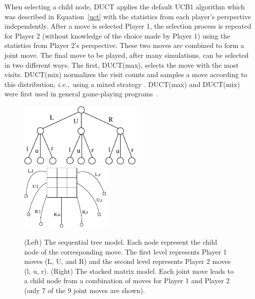 \documentclass{article}
\newcommand{\ie}{{\it i.e.,}~}
\begin{document}
When selecting a child node, DUCT applies the default UCB1 algorithm which was described in Equation~\ref{uct} with the statistics from each player's perspective independently. After a move is selected Player 1, the selection process is repeated for Player 2 (without knowledge of the choice made by Player 1) using the statistics from Player 2's perspective. These two moves are combined to form a joint move.
The final move to be played, after many simulations, can be selected in two different ways. The first, DUCT(max), selects the move with the most visits. 
DUCT(mix) normalizes the visit counts and samples a move according to this distribution, \ie using a mixed strategy \cite{mcts_goofspiel}. 
DUCT(max) and DUCT(mix) were first used in general game-playing programs~\cite{finnson_master,Shafiei09}.

\begin{figure}
\begin{center}
\includegraphics[width=6cm]{seq-model.pdf}~~~~~~~~~~~~~~~\includegraphics[width=4.4cm]{mat-model.pdf}
\caption{(Left) The sequential tree model. Each node represent the child node of the corresponding move. The first level represents Player 1 moves (L, U, and R) and the second level represents Player 2 moves (l, u, r). 
(Right) The stacked matrix model. Each joint move leads to a child node from a combination of moves for Player 1 and Player 2 (only 7 of the 9 joint moves are shown).
\label{fig:suct_vs_duct}}
\end{center}
\end{figure}
\end{document}

